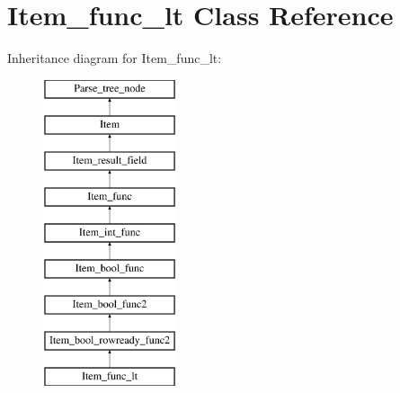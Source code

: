 \hypertarget{classItem__func__lt}{}\section{Item\+\_\+func\+\_\+lt Class Reference}
\label{classItem__func__lt}
Inheritance diagram for Item\+\_\+func\+\_\+lt\+:\begin{figure}[H]
\begin{center}
\leavevmode
\includegraphics[height=9.000000cm]{classItem__func__lt}
\end{center}
\end{figure}
